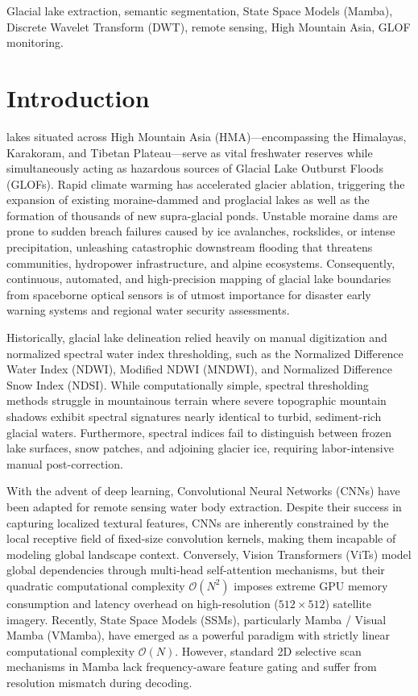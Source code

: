 \documentclass[journal]{IEEEtran}
\begin{document}
\begin{IEEEkeywords}
Glacial lake extraction, semantic segmentation, State Space Models (Mamba), Discrete Wavelet Transform (DWT), remote sensing, High Mountain Asia, GLOF monitoring.
\end{IEEEkeywords}

\section{Introduction}
 lakes situated across High Mountain Asia (HMA)—encompassing the Himalayas, Karakoram, and Tibetan Plateau—serve as vital freshwater reserves while simultaneously acting as hazardous sources of Glacial Lake Outburst Floods (GLOFs). Rapid climate warming has accelerated glacier ablation, triggering the expansion of existing moraine-dammed and proglacial lakes as well as the formation of thousands of new supra-glacial ponds. Unstable moraine dams are prone to sudden breach failures caused by ice avalanches, rockslides, or intense precipitation, unleashing catastrophic downstream flooding that threatens communities, hydropower infrastructure, and alpine ecosystems. Consequently, continuous, automated, and high-precision mapping of glacial lake boundaries from spaceborne optical sensors is of utmost importance for disaster early warning systems and regional water security assessments.

Historically, glacial lake delineation relied heavily on manual digitization and normalized spectral water index thresholding, such as the Normalized Difference Water Index (NDWI), Modified NDWI (MNDWI), and Normalized Difference Snow Index (NDSI). While computationally simple, spectral thresholding methods struggle in mountainous terrain where severe topographic mountain shadows exhibit spectral signatures nearly identical to turbid, sediment-rich glacial waters. Furthermore, spectral indices fail to distinguish between frozen lake surfaces, snow patches, and adjoining glacier ice, requiring labor-intensive manual post-correction.

With the advent of deep learning, Convolutional Neural Networks (CNNs) have been adapted for remote sensing water body extraction. Despite their success in capturing localized textural features, CNNs are inherently constrained by the local receptive field of fixed-size convolution kernels, making them incapable of modeling global landscape context. Conversely, Vision Transformers (ViTs) model global dependencies through multi-head self-attention mechanisms, but their quadratic computational complexity $\mathcal{O}(N^2)$ imposes extreme GPU memory consumption and latency overhead on high-resolution ($512 \times 512$) satellite imagery. Recently, State Space Models (SSMs), particularly Mamba / Visual Mamba (VMamba), have emerged as a powerful paradigm with strictly linear computational complexity $\mathcal{O}(N)$. However, standard 2D selective scan mechanisms in Mamba lack frequency-aware feature gating and suffer from resolution mismatch during decoding.
\end{document}
